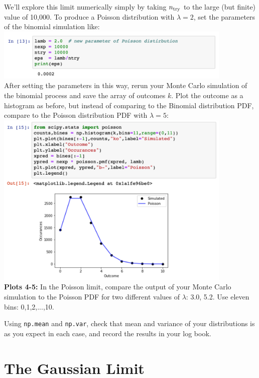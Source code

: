 We'll explore this limit numerically simply by taking $n_{\rm try}$ to
the large (but finite) value of 10,000.  To produce a Poisson distribution with $\lambda = 2$, set the parameters of the binomial simulation like:
\includegraphics[width=0.85\textwidth]{figs/labs/distributions/poissonlimit.png}\\
After setting the parameters in this way, rerun your Monte Carlo simulation of the binomial process and save the array of outcomes $k$.  Plot the outcome as a histogram as before, but instead of comparing to the Binomial distribution PDF, compare to the Poisson distribution PDF with $\lambda = 5$:\\
\includegraphics[width=0.85\textwidth]{figs/labs/distributions/poisson.png}\\

{\bf Plots 4-5:}  In the Poisson limit, compare the output of your Monte Carlo simulation to the Poisson PDF
for two different values of $\lambda$:  3.0, 5.2.  Use eleven bins: 0,1,2,...,10.

Using {\tt np.mean} and {\tt np.var}, check that mean and variance of
your distributions is as you expect in each case, and record the
results in your log book.

\section{The Gaussian Limit}

